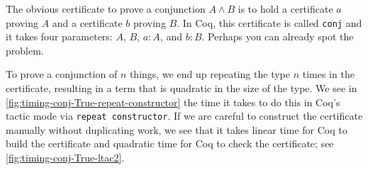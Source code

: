 The obvious certificate to prove a conjunction $A \wedge B$ is to hold a certificate $a$ proving $A$ and a certificate $b$ proving $B$.
In Coq, this certificate is called \texttt{conj} and it takes four parameters: $A$, $B$, $a : A$, and $b : B$.
Perhaps you can already spot the problem.

To prove a conjunction of $n$ things, we end up repeating the type $n$ times in the certificate, resulting in a term that is quadratic in the size of the type.
We see in \autoref{fig:timing-conj-True-repeat-constructor} the time it takes to do this in Coq's tactic mode via \texttt{repeat constructor}.
If we are careful to construct the certificate manually without duplicating work, we see that it takes linear time for Coq to build the certificate and quadratic time for Coq to check the certificate; see \autoref{fig:timing-conj-True-ltac2}.

